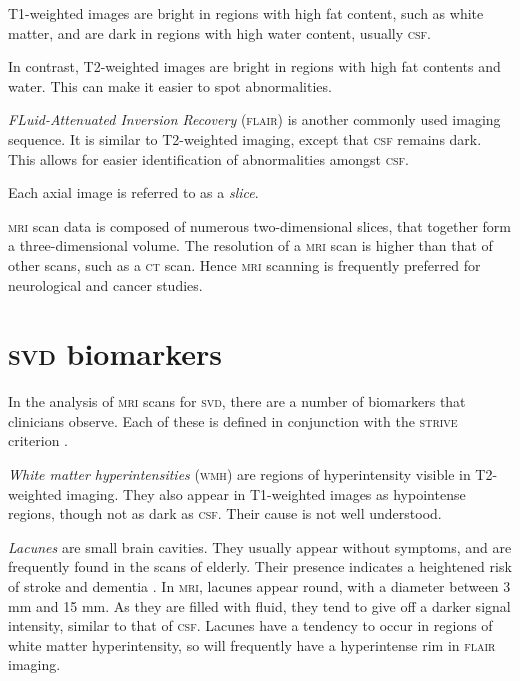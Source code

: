 T1-weighted images are bright in regions with high fat content, such as white matter, and are dark in regions with high water content, usually \textsc{csf}.

In contrast, T2-weighted images are bright in regions with high fat contents and water. This can make it easier to spot abnormalities.

\textit{FLuid-Attenuated Inversion Recovery} (\textsc{flair}) is another commonly used imaging sequence. It is similar to T2-weighted imaging, except that \textsc{csf} remains dark. This allows for easier identification of abnormalities amongst \textsc{csf}.

Each axial image is referred to as a \textit{slice}.


\textsc{mri} scan data is composed of numerous two-dimensional slices, that together form a three-dimensional volume. The resolution of a \textsc{mri} scan is higher than that of other scans, such as a \textsc{ct} scan. Hence \textsc{mri} scanning is frequently preferred for neurological and cancer studies.

\section{\textsc{svd} biomarkers}\label{svd-markers}

In the analysis of \textsc{mri} scans for \textsc{svd}, there are a number of biomarkers that clinicians observe. Each of these is defined in conjunction with the \textsc{strive} criterion \cite{WardlawJ.M.2013Nsfr}.

\textit{White matter hyperintensities} (\textsc{wmh}) are regions of hyperintensity visible in T2-weighted imaging. They also appear in T1-weighted images as hypointense regions, though not as dark as \textsc{csf}. Their cause is not well understood.

\textit{Lacunes} are small brain cavities. They usually appear without symptoms, and are frequently found in the scans of elderly. Their presence indicates a heightened risk of stroke and dementia \cite{BenjaminJ.Philip2018LIbN,VanDerFlierM.Wiesje2005SVDa}. In \textsc{mri}, lacunes appear round, with a diameter between 3 mm and 15 mm. As they are filled with fluid, they tend to give off a darker signal intensity, similar to that of \textsc{csf}. Lacunes have a tendency to occur in regions of white matter hyperintensity, so will frequently have a hyperintense rim in \textsc{flair} imaging.

